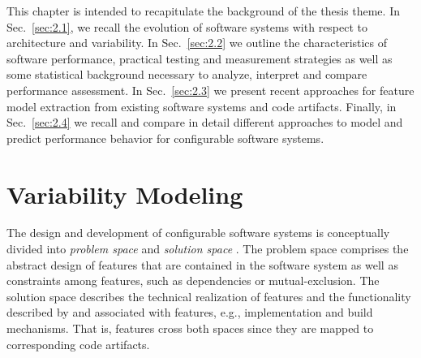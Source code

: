 This chapter is intended to recapitulate the background of the thesis theme. In
Sec.~\ref{sec:2.1}, we recall the evolution of software systems with respect to
architecture and variability. In Sec.~\ref{sec:2.2} we outline the characteristics
of software performance, practical testing and measurement strategies as well as
some statistical background necessary to analyze, interpret and compare
performance assessment. In Sec.~\ref{sec:2.3} we present recent approaches for
feature model extraction from existing software systems and code artifacts. Finally, in
Sec.~\ref{sec:2.4} we recall and compare in detail different approaches to model
and predict performance behavior for configurable software systems.

\section{Variability Modeling}
The design and development of configurable software systems is conceptually
divided into \emph{problem space} and \emph{solution space} \citep{czarnecki_generative_2000}. The problem space
comprises the abstract design of features that are contained in the software system as well as
constraints among features, such as dependencies or mutual-exclusion. The
solution space describes the technical realization of features and the
functionality described by and associated with features, e.g., implementation
and build mechanisms. That is, features cross both spaces since they are mapped
to corresponding code artifacts.

